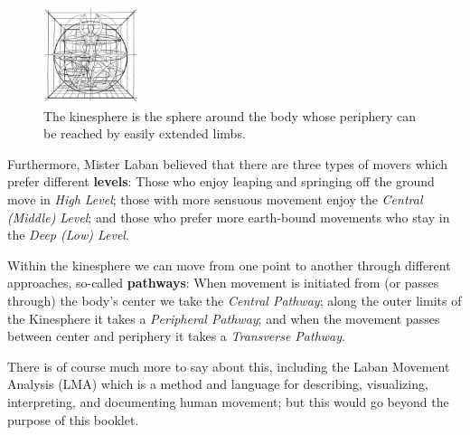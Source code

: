 \begin{figure}
    \centering
    \includegraphics[width=0.25\textwidth]{images/kinsphere}
    \caption{The kinesphere is the sphere around the body whose periphery can be reached by easily extended limbs.}
\end{figure}

Furthermore, Mister Laban believed that there are three types of movers which prefer different \textbf{levels}: Those who enjoy leaping and springing off the ground move in \textit{High Level}; those with more sensuous movement enjoy the \textit{Central (Middle) Level}; and those who prefer more earth-bound movements who stay in the \textit{Deep (Low) Level}.

Within the kinesphere we can move from one point to another through different approaches, so-called \textbf{pathways}: When movement is initiated from (or passes through) the body's center we take the \textit{Central Pathway}; along the outer limits of the Kinesphere it takes a \textit{Peripheral Pathway}; and when the movement passes between center and periphery it takes a \textit{Transverse Pathway}.

There is of course much more to say about this, including the Laban Movement Analysis (LMA) which is a method and language for describing, visualizing, interpreting, and documenting human movement; but this would go beyond the purpose of this booklet.
